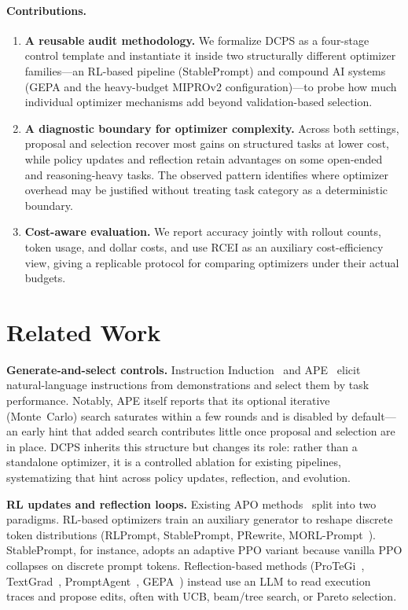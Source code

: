 \documentclass[runningheads]{llncs}
\begin{document}
\paragraph{Contributions.}
\begin{enumerate}
    \item \textbf{A reusable audit methodology.} We formalize DCPS as a four-stage control template and instantiate it inside two structurally different optimizer families---an RL-based pipeline (StablePrompt) and compound AI systems (GEPA and the heavy-budget MIPROv2 configuration)---to probe how much individual optimizer mechanisms add beyond validation-based selection.
    \item \textbf{A diagnostic boundary for optimizer complexity.} Across both settings, proposal and selection recover most gains on structured tasks at lower cost, while policy updates and reflection retain advantages on some open-ended and reasoning-heavy tasks. The observed pattern identifies where optimizer overhead may be justified without treating task category as a deterministic boundary.
    \item \textbf{Cost-aware evaluation.} We report accuracy jointly with rollout counts, token usage, and dollar costs, and use RCEI as an auxiliary cost-efficiency view, giving a replicable protocol for comparing optimizers under their actual budgets.
\end{enumerate}


\section{Related Work}
\label{sec:related-work}

\textbf{Generate-and-select controls.} Instruction Induction~\cite{honovich2022instruction} and APE~\cite{zhou2023ape} elicit natural-language instructions from demonstrations and select them by task performance. Notably, APE itself reports that its optional iterative (Monte~Carlo) search saturates within a few rounds and is disabled by default---an early hint that added search contributes little once proposal and selection are in place. DCPS inherits this structure but changes its role: rather than a standalone optimizer, it is a controlled ablation for existing pipelines, systematizing that hint across policy updates, reflection, and evolution.

\textbf{RL updates and reflection loops.} Existing APO methods~\cite{ramnath2025systematic} split into two paradigms. RL-based optimizers train an auxiliary generator to reshape discrete token distributions (RLPrompt, StablePrompt, PRewrite, MORL-Prompt\ \cite{deng2022rlprompt,kwon2024stableprompt,kong2024prewrite,jafari2024morl}). StablePrompt, for instance, adopts an adaptive PPO variant because vanilla PPO collapses on discrete prompt tokens. Reflection-based methods (ProTeGi~\cite{pryzant2023protegi}, TextGrad~\cite{yuksekgonul2024textgrad}, PromptAgent~\cite{wang2024a}, GEPA~\cite{gepa}) instead use an LLM to read execution traces and propose edits, often with UCB, beam/tree search, or Pareto selection.
\end{document}

